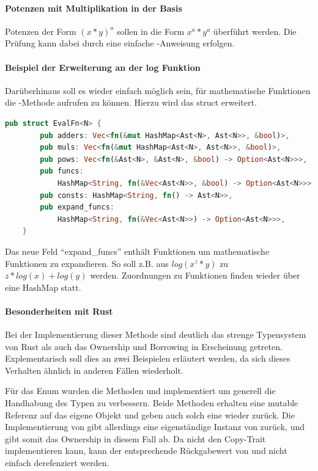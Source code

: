\documentclass[11pt,a4paper, ngerman]{article}
\begin{document}
\paragraph{Potenzen mit Multiplikation in der Basis} Potenzen der Form $(x*y)^a$ sollen in die Form $x^a*y^a$ überführt werden. Die Prüfung kann dabei durch eine einfache -Anweisung erfolgen.

\paragraph{Beispiel der Erweiterung an der log Funktion} Darüberhinaus soll es wieder einfach möglich sein, für mathematische Funktionen die -Methode aufrufen zu können. Hierzu wird das struct  erweitert.

\begin{lstlisting}[language=rust, caption={EvalFn nach expand}]
    pub struct EvalFn<N> {
        pub adders: Vec<fn(&mut HashMap<Ast<N>, Ast<N>>, &bool)>,
        pub muls: Vec<fn(&mut HashMap<Ast<N>, Ast<N>>, &bool)>,
        pub pows: Vec<fn(&Ast<N>, &Ast<N>, &bool) -> Option<Ast<N>>>,
        pub funcs: 
            HashMap<String, fn(&Vec<Ast<N>>, &bool) -> Option<Ast<N>>>,
        pub consts: HashMap<String, fn() -> Ast<N>>,
        pub expand_funcs: 
            HashMap<String, fn(&Vec<Ast<N>>) -> Option<Ast<N>>>,
    }
\end{lstlisting}

Das neue Feld ``expand\_funcs'' enthält Funktionen um mathematische Funktionen zu expandieren. So soll z.B. aus $log(x^z*y)$ zu $z*log(x)+log(y)$ werden. Zuordnungen zu Funktionen finden wieder über eine HashMap statt.

\paragraph{Besonderheiten mit Rust} Bei der Implementierung dieser Methode sind deutlich das strenge Typensystem von Rust als auch das Ownership und Borrowing in Erscheinung getreten. Explementarisch soll dies an zwei Beispielen erläutert werden, da sich dieses Verhalten ähnlich in anderen Fällen wiederholt.

Für das Enum  wurden die Methoden  und  implementiert um generell die Handhabung des Typen zu verbessern. Beide Methoden erhalten eine mutable Referenz auf das eigene Objekt und geben auch solch eine wieder zurück. Die Implementierung von  gibt allerdings eine eigenständige Instanz von  zurück, und gibt somit das Ownership in diesem Fall ab. Da  nicht den Copy-Trait implementieren kann, kann der entsprechende Rückgabewert von  und  nicht einfach derefenziert werden.
\end{document}
